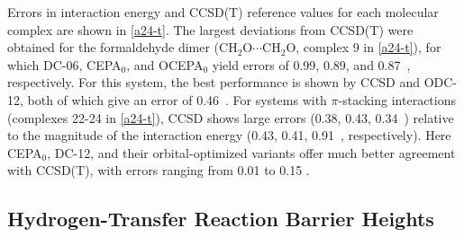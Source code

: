 Errors in interaction energy and CCSD(T) reference values for each molecular
complex are shown in \cref{a24-t}.
The largest deviations from CCSD(T) were obtained for the formaldehyde dimer
($\mathrm{CH_2O }\cdots\mathrm{CH_2O }$, complex 9 in \cref{a24-t}), for which
DC-06, CEPA$_0$, and OCEPA$_0$ yield errors of 0.99, 0.89, and 0.87~\kcal,
respectively.
For this system, the best performance is shown by CCSD and ODC-12, both of which
give an error of 0.46~\kcal.
For systems with $\pi$-stacking interactions (complexes 22-24 in \cref{a24-t}),
CCSD shows large errors (0.38, 0.43, 0.34~\kcal) relative to the magnitude of
the interaction energy (0.43, 0.41, 0.91~\kcal, respectively).
Here CEPA$_0$, DC-12, and their orbital-optimized variants offer much better
agreement with CCSD(T), with errors ranging from 0.01 to 0.15 \kcal.


\subsection{Hydrogen-Transfer Reaction Barrier Heights}

